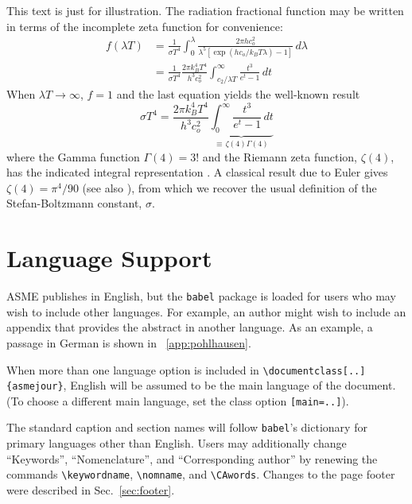 \documentclass[balance,nocopyright,upint,varvw,hyphenate,barcolor=Goldenrod3,german]{asmejour}%
\begin{document}
This text is just for illustration. The radiation fractional function may be written in terms of the incomplete zeta function for convenience:
\begin{align}
f(\lambda T)  &=  \frac{1}{\sigma T^4} \int_0^\lambda\frac{2\pi h c_o^2}{\lambda^5 \left[ \exp (h c_o/k_B T \lambda) - 1\right] } \, d\lambda \\
              &=  \frac{1}{\sigma T^4}\frac{2\pi k_B^4 T^4}{h^3c_o^2}\int^\infty_{c_2/\lambda T}\frac{t^3}{e^t -1}\, dt\label{eqn:zeta}
\end{align}
When $\lambda T \rightarrow \infty$, $f = 1$ and the last equation yields the well-known result
\begin{equation}
\sigma T^4 =\frac{2\pi k_B^4 T^4}{h^3c_o^2} \underbrace{\int_0^\infty \frac{t^3}{e^t - 1} \, dt}_{\equiv\mspace{2mu} \zeta(4)\Gamma(4)} 
\end{equation}
where the Gamma function $\Gamma(4) = 3!$ and the Riemann zeta function, $\zeta(4)$, has the indicated integral representation \cite[\S13.12]{ww1927}.  A classical result due to Euler \cite{euler1740} gives $\zeta(4) = \pi^4/90$ (see also \cite[\S167]{euler1748}), from which we recover the usual definition of the  Stefan-Boltzmann constant, $\sigma$. 


\section{Language Support\label{app:language}}

ASME publishes in English, but the \texttt{babel} package is loaded for users who may wish to include other languages. 
For example, an author might wish to include an appendix that provides the abstract in another language. As an example, 
a passage in German is shown in \appendixname~\ref{app:pohlhausen}.

When more than one language option is included in \verb|\documentclass[..]{asmejour}|, English will be 
assumed to be the main language of the document. (To choose a different main language, set the class option \texttt{[main=..]}).

The standard caption and section names will follow \texttt{babel}'s dictionary for primary languages other than English.  Users may additionally change ``Keywords'', ``Nomenclature'', and  ``Corresponding author'' by renewing the commands \verb|\keywordname|, \verb|\nomname|, and \verb|\CAwords|. Changes to the page footer were described in Sec.~\ref{sec:footer}.
\end{document}

